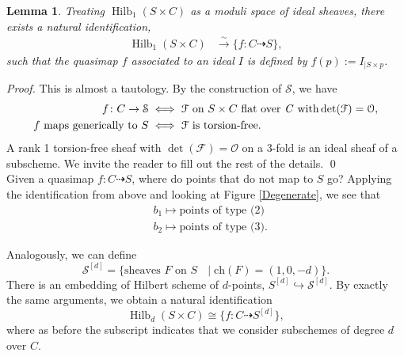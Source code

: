 \documentclass[11pt, reqno]{amsart}
\theoremstyle{plain}
\newtheorem{lemma}[thm]{Lemma}
\theoremstyle{definition}
\theoremstyle{remark}
\newcommand{\CF}{{\mathcal F}}
\newcommand{\CO}{{\mathcal O}}
\newcommand{\CS}{{\mathcal S}}
\newcommand{\ch}{{\mathrm{ch}}}
\DeclareMathOperator{\Hilb}{Hilb}
\begin{document}
\begin{lemma} \label{graph} Treating $\Hilb_1(S\times C)$ as a moduli space of ideal sheaves, there exists a natural identification, 
	\begin{align*}
	\Hilb_1(S\times C) &\xrightarrow{\sim } \{ f\colon C \dasharrow S \}, 
	\end{align*}
such that the quasimap $f$ associated to an ideal $I$ is defined by $f(p):=I_{|S\times p}$. 
	\end{lemma}
\textit{Proof.} This is almost a tautology. By the construction of $\CS$, we have
\begin{align*}
	f\colon C\rightarrow \CS &\iff \CF\text{ on } S\times C \text{ flat over \textit{C} with} \det(\CF)=\CO,\\
	f \text{ maps generically to } S &\iff \CF \text{ is torsion-free.} 
	\end{align*}
A rank 1 torsion-free sheaf with $\det(\CF)=\CO$ on a 3-fold is an ideal sheaf of a subscheme. We invite the reader to fill out the rest of the details. \qed 
\\


Given a quasimap $f \colon C \dasharrow S$, where do points that do not map to $S$ go? Applying the identification from above and looking at Figure \ref{Degenerate}, we see that 
\begin{align*}
& b_1 \mapsto \text{points of type (2)} \\
 & b_2 \mapsto \text{points of type (3)}.
 \end{align*}

Analogously, we can define
\[\CS^{[d]}=\{\text{sheaves $F$ on $S$ }\mid  \ch(F)=(1,0,-d) \}.\]
There is an embedding of Hilbert scheme of $d$-points,  $S^{[d]} \hookrightarrow \CS^{[d]}.$ 
By exactly the same arguments, we obtain a natural identification 
\[\Hilb_d(S\times C) \cong \{ f\colon C \dasharrow S^{[d]}  \},\]
where as before the subscript indicates that we consider subschemes of degree $d$ over $C$. 
\end{document}
